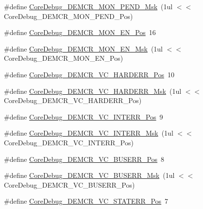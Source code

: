 \begin{DoxyCompactItemize}
\#define \hyperlink{group___c_m_s_i_s___c_m3___core_debug_ga68ec55930269fab78e733dcfa32392f8}{Core\-Debug\-\_\-\-D\-E\-M\-C\-R\-\_\-\-M\-O\-N\-\_\-\-P\-E\-N\-D\-\_\-\-Msk}~(1ul $<$$<$ Core\-Debug\-\_\-\-D\-E\-M\-C\-R\-\_\-\-M\-O\-N\-\_\-\-P\-E\-N\-D\-\_\-\-Pos)
\item 
\#define \hyperlink{group___c_m_s_i_s___c_m3___core_debug_ga802829678f6871863ae9ecf60a10425c}{Core\-Debug\-\_\-\-D\-E\-M\-C\-R\-\_\-\-M\-O\-N\-\_\-\-E\-N\-\_\-\-Pos}~16
\item 
\#define \hyperlink{group___c_m_s_i_s___c_m3___core_debug_gac2b46b9b65bf8d23027f255fc9641977}{Core\-Debug\-\_\-\-D\-E\-M\-C\-R\-\_\-\-M\-O\-N\-\_\-\-E\-N\-\_\-\-Msk}~(1ul $<$$<$ Core\-Debug\-\_\-\-D\-E\-M\-C\-R\-\_\-\-M\-O\-N\-\_\-\-E\-N\-\_\-\-Pos)
\item 
\#define \hyperlink{group___c_m_s_i_s___c_m3___core_debug_gaed9f42053031a9a30cd8054623304c0a}{Core\-Debug\-\_\-\-D\-E\-M\-C\-R\-\_\-\-V\-C\-\_\-\-H\-A\-R\-D\-E\-R\-R\-\_\-\-Pos}~10
\item 
\#define \hyperlink{group___c_m_s_i_s___c_m3___core_debug_ga803fc98c5bb85f10f0347b23794847d1}{Core\-Debug\-\_\-\-D\-E\-M\-C\-R\-\_\-\-V\-C\-\_\-\-H\-A\-R\-D\-E\-R\-R\-\_\-\-Msk}~(1ul $<$$<$ Core\-Debug\-\_\-\-D\-E\-M\-C\-R\-\_\-\-V\-C\-\_\-\-H\-A\-R\-D\-E\-R\-R\-\_\-\-Pos)
\item 
\#define \hyperlink{group___c_m_s_i_s___c_m3___core_debug_ga22079a6e436f23b90308be97e19cf07e}{Core\-Debug\-\_\-\-D\-E\-M\-C\-R\-\_\-\-V\-C\-\_\-\-I\-N\-T\-E\-R\-R\-\_\-\-Pos}~9
\item 
\#define \hyperlink{group___c_m_s_i_s___c_m3___core_debug_gad6815d8e3df302d2f0ff2c2c734ed29a}{Core\-Debug\-\_\-\-D\-E\-M\-C\-R\-\_\-\-V\-C\-\_\-\-I\-N\-T\-E\-R\-R\-\_\-\-Msk}~(1ul $<$$<$ Core\-Debug\-\_\-\-D\-E\-M\-C\-R\-\_\-\-V\-C\-\_\-\-I\-N\-T\-E\-R\-R\-\_\-\-Pos)
\item 
\#define \hyperlink{group___c_m_s_i_s___c_m3___core_debug_gab8e3d8f0f9590a51bbf10f6da3ad6933}{Core\-Debug\-\_\-\-D\-E\-M\-C\-R\-\_\-\-V\-C\-\_\-\-B\-U\-S\-E\-R\-R\-\_\-\-Pos}~8
\item 
\#define \hyperlink{group___c_m_s_i_s___c_m3___core_debug_ga9d29546aefe3ca8662a7fe48dd4a5b2b}{Core\-Debug\-\_\-\-D\-E\-M\-C\-R\-\_\-\-V\-C\-\_\-\-B\-U\-S\-E\-R\-R\-\_\-\-Msk}~(1ul $<$$<$ Core\-Debug\-\_\-\-D\-E\-M\-C\-R\-\_\-\-V\-C\-\_\-\-B\-U\-S\-E\-R\-R\-\_\-\-Pos)
\item 
\#define \hyperlink{group___c_m_s_i_s___c_m3___core_debug_ga16f0d3d2ce1e1e8cd762d938ac56c4ac}{Core\-Debug\-\_\-\-D\-E\-M\-C\-R\-\_\-\-V\-C\-\_\-\-S\-T\-A\-T\-E\-R\-R\-\_\-\-Pos}~7
$$
\end{DoxyCompactItemize}
